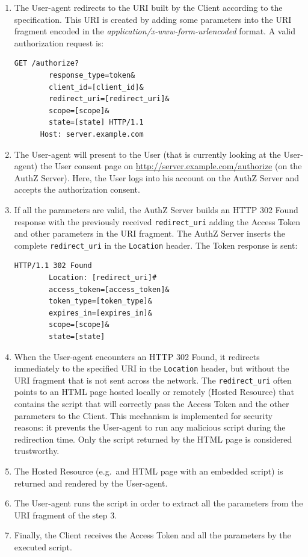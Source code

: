 \documentclass[a4paper,12pt]{article}
\def\eg{e.g.\xspace}
\begin{document}
\label{step1implicit}
\begin{enumerate}
    \item The User-agent redirects to the URI built by the Client according to the specification. This URI is created by adding some parameters into the URI fragment encoded in the \textit{application/x-www-form-urlencoded} format. A valid authorization request is:

    \begin{lstlisting}[basicstyle=\ttfamily]
      GET /authorize?
        response_type=token&
        client_id=[client_id]&
        redirect_uri=[redirect_uri]&
        scope=[scope]&
        state=[state] HTTP/1.1
      Host: server.example.com
    \end{lstlisting}
    
    \item The User-agent will present to the User (that is currently looking at the User-agent) the User consent page on \url{http://server.example.com/authorize} (on the AuthZ Server). Here, the User logs into his account on the AuthZ Server and accepts the authorization consent.
    
    \item If all the parameters are valid, the AuthZ Server builds an HTTP 302 Found response with the previously received \texttt{redirect\_uri} adding the Access Token and other parameters in the URI fragment. The AuthZ Server inserts the complete \texttt{redirect\_uri} in the \texttt{Location} header. The Token response is sent:
    
    \begin{lstlisting}[basicstyle=\ttfamily]
      HTTP/1.1 302 Found
        Location: [redirect_uri]#
        access_token=[access_token]&
        token_type=[token_type]&
        expires_in=[expires_in]&
        scope=[scope]&
        state=[state]
    \end{lstlisting}
    
    \item When the User-agent encounters an HTTP 302 Found, it redirects immediately to the specified URI in the \texttt{Location} header, but without the URI fragment that is not sent across the network. The \texttt{redirect\_uri} often points to an HTML page hosted locally or remotely (Hosted Resource) that contains the script that will correctly pass the Access Token and the other parameters to the Client. This mechanism is implemented for security reasons: it prevents the User-agent to run any malicious script during the redirection time. Only the script returned by the HTML page is considered trustworthy.
    
    \item The Hosted Resource (\eg\ and HTML page with an embedded script) is returned and rendered by the User-agent.
    
    \item  The User-agent runs the script in order to extract all the parameters from the URI fragment of the step 3.
    
    \item Finally, the Client receives the Access Token and all the parameters by the executed script.
\end{enumerate}
\end{document}
